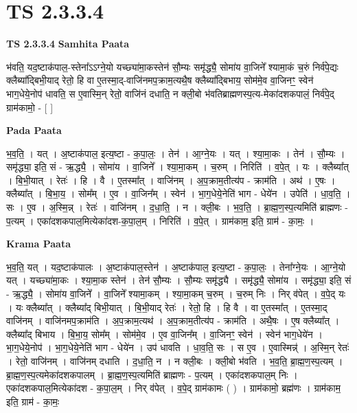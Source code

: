 \documentclass[17pt]{extarticle}
\begin{document}
\section*{ TS 2.3.3.4 }

\textbf{TS 2.3.3.4 } \newline
\textbf{Samhita Paata} \newline

भ॑वति॒ यद॒ष्टाक॑पाल॒-स्तेना᳚ऽऽग्ने॒यो यच्छ्या॑मा॒कस्तेन॑ सौ॒म्यः समृ॑द्ध्यै॒ सोमा॑य वा॒जिने᳚ श्यामा॒कं च॒रुं निर्व॑पे॒द्यः क्लैब्या᳚द्बिभी॒याद् रेतो॒ हि वा ए॒तस्मा॒द्-वाजि॑नमप॒क्राम॒त्यथै॒ष क्लैब्या᳚द्बिभाय॒ सोम॑मे॒व वा॒जिनꣳ॒॒ स्वेन॑ भाग॒धेये॒नोप॑ धावति॒ स ए॒वास्मि॒न् रेतो॒ वाजि॑नं दधाति॒ न क्ली॒बो भ॑वतिब्राह्मणस्प॒त्य-मेका॑दशकपालं॒ निर्व॑पे॒द् ग्राम॑कामो॒ - [  ] \newline

\textbf{Pada Paata} \newline

भ॒व॒ति॒ । यत् । अ॒ष्टाक॑पाल॒ इत्य॒ष्टा - क॒पा॒लः॒ । तेन॑ । आ॒ग्ने॒यः । यत् । श्या॒मा॒कः । तेन॑ । सौ॒म्यः । समृ॑द्ध्या॒ इति॒ सं - ऋ॒द्ध्यै॒ । सोमा॑य । वा॒जिने᳚ । श्या॒मा॒कम् । च॒रुम् । निरिति॑ । व॒पे॒त् । यः । क्लैब्या᳚त् । बि॒भी॒यात् । रेतः॑ । हि । वै । ए॒तस्मा᳚त् । वाजि॑नम् । अ॒प॒क्राम॒तीत्य॑प - क्राम॑ति । अथ॑ । ए॒षः । क्लैब्या᳚त् । बि॒भा॒य॒ । सोम᳚म् । ए॒व । वा॒जिन᳚म् । स्वेन॑ । भा॒ग॒धेये॒नेति॑ भाग - धेये॑न । उपेति॑ । धा॒व॒ति॒ । सः । ए॒व । अ॒स्मि॒न्न् । रेतः॑ । वाजि॑नम् । द॒धा॒ति॒ । न । क्ली॒बः । भ॒व॒ति॒ । ब्रा॒ह्म॒ण॒स्प॒त्यमिति॑ ब्राह्मणः - प॒त्यम् । एका॑दशकपाल॒मित्येका॑दश-क॒पा॒ल॒म् । निरिति॑ । व॒पे॒त् । ग्राम॑काम॒ इति॒ ग्राम॑ - का॒मः॒ ।  \newline


\textbf{Krama Paata} \newline

भ॒व॒ति॒ यत् । यद॒ष्टाक॑पालः । अ॒ष्टाक॑पाल॒स्तेन॑ । अ॒ष्टाक॑पाल॒ इत्य॒ष्टा - क॒पा॒लः॒ । तेना᳚ग्ने॒यः । आ॒ग्ने॒यो यत् । यच्छ्या॑मा॒कः । श्या॒मा॒क स्तेन॑ । तेन॑ सौ॒म्यः । सौ॒म्यः समृ॑द्ध्यै । समृ॑द्ध्यै॒ सोमा॑य । समृ॑द्ध्या॒ इति॒ सं - ऋ॒द्ध्यै॒ । सोमा॑य वा॒जिने᳚ । वा॒जिने᳚ श्यामा॒कम् । श्या॒मा॒कम् च॒रुम् । च॒रुम् निः । निर् व॑पेत् । व॒पे॒द् यः । यः क्लैब्या᳚त् । क्लैब्या᳚द् बिभी॒यात् । बि॒भी॒याद् रेतः॑ । रेतो॒ हि । हि वै । वा ए॒तस्मा᳚त् । ए॒तस्मा॒द् वाजि॑नम् । वाजि॑नमप॒क्राम॑ति । अ॒प॒क्राम॒त्यथ॑ । अ॒प॒क्राम॒तीत्य॑प - क्राम॑ति । अथै॒षः । ए॒ष क्लैब्या᳚त् । क्लैब्या᳚द् बिभाय । बि॒भा॒य॒ सोम᳚म् । सोम॑मे॒व । ए॒व वा॒जिन᳚म् । वा॒जिनꣳ॒॒ स्वेन॑ । स्वेन॑ भाग॒धेये॑न । भा॒ग॒धेये॒नोप॑ । भा॒ग॒धेये॒नेति॑ भाग - धेये॑न । उप॑ धावति । धा॒व॒ति॒ सः । स ए॒व । ए॒वास्मिन्न्॑ । अ॒स्मि॒न् रेतः॑ । रेतो॒ वाजि॑नम् । वाजि॑नम् दधाति । द॒धा॒ति॒ न । न क्ली॒बः । क्ली॒बो भ॑वति । भ॒व॒ति॒ ब्रा॒ह्म॒ण॒स्प॒त्यम् । ब्रा॒ह्म॒ण॒स्प॒त्यमेका॑दशकपालम् । ब्रा॒ह्म॒ण॒स्प॒त्यमिति॑ ब्राह्मणः - प॒त्यम् । एका॑दशकपाल॒म् निः । एका॑दशकपाल॒मित्येका॑दश - क॒पा॒ल॒म् । निर् व॑पेत् । व॒पे॒द् ग्राम॑कामः ( ) 
। ग्राम॑कामो॒ ब्रह्म॑णः । ग्राम॑काम॒ इति॒ ग्राम॑ - का॒मः॒ \newline
\end{document}
